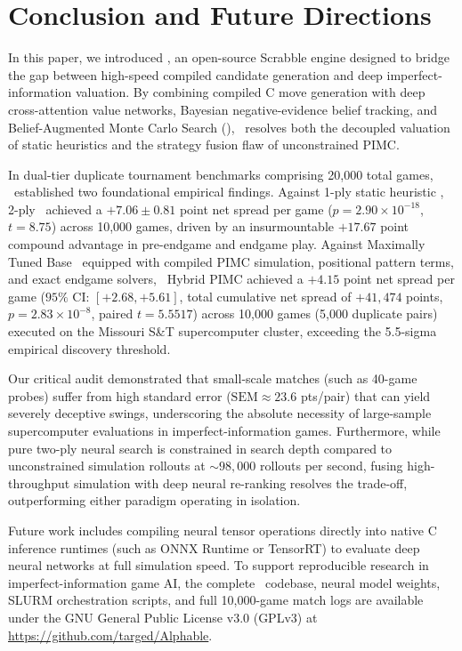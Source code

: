 \section{Conclusion and Future Directions}
\label{sec:conclusion}

In this paper, we introduced \algo, an open-source Scrabble engine designed to bridge the gap between high-speed compiled candidate generation and deep imperfect-information valuation. By combining compiled C move generation with deep cross-attention value networks, Bayesian negative-evidence belief tracking, and Belief-Augmented Monte Carlo Search (\bams), \algo\ resolves both the decoupled valuation of static heuristics and the strategy fusion flaw of unconstrained PIMC.

In dual-tier duplicate tournament benchmarks comprising 20,000 total games, \algo\ established two foundational empirical findings. Against 1-ply static heuristic \magpie, 2-ply \bams\ achieved a $+7.06 \pm 0.81$ point net spread per game ($p = 2.90 \times 10^{-18}$, $t = 8.75$) across 10,000 games, driven by an insurmountable $+17.67$ point compound advantage in pre-endgame and endgame play. Against Maximally Tuned Base \magpie\ equipped with compiled PIMC simulation, positional pattern terms, and exact endgame solvers, \algo\ Hybrid PIMC achieved a $+4.15$ point net spread per game ($95\%$ CI: $[+2.68, +5.61]$, total cumulative net spread of $+41,474$ points, $p = 2.83 \times 10^{-8}$, paired $t = 5.5517$) across 10,000 games (5,000 duplicate pairs) executed on the Missouri S\&T supercomputer cluster, exceeding the 5.5-sigma empirical discovery threshold.

Our critical audit demonstrated that small-scale matches (such as 40-game probes) suffer from high standard error ($\mathrm{SEM} \approx 23.6$ pts/pair) that can yield severely deceptive swings, underscoring the absolute necessity of large-sample supercomputer evaluations in imperfect-information games. Furthermore, while pure two-ply neural search is constrained in search depth compared to unconstrained simulation rollouts at $\sim 98,000$ rollouts per second, fusing high-throughput simulation with deep neural re-ranking resolves the trade-off, outperforming either paradigm operating in isolation.

Future work includes compiling neural tensor operations directly into native C inference runtimes (such as ONNX Runtime or TensorRT) to evaluate deep neural networks at full simulation speed. To support reproducible research in imperfect-information game AI, the complete \algo\ codebase, neural model weights, SLURM orchestration scripts, and full 10,000-game match logs are available under the GNU General Public License v3.0 (GPLv3) at \url{https://github.com/targed/Alphable}.
